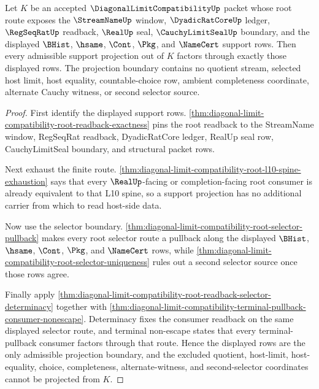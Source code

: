 \begin{theorem}
\label{thm:diagonal-limit-compatibility-root-support-projection-nonescape}
Let $K$ be an accepted $\DiagonalLimitCompatibilityUp$ packet whose root route exposes the $\StreamNameUp$ window, $\DyadicRatCoreUp$ ledger, $\RegSeqRatUp$ readback, $\RealUp$ seal, $\CauchyLimitSealUp$ boundary, and the displayed $\BHist$, $\hsame$, $\Cont$, $\Pkg$, and $\NameCert$ support rows. Then every admissible support projection out of $K$ factors through exactly those displayed rows. The projection boundary contains no quotient stream, selected host limit, host equality, countable-choice row, ambient completeness coordinate, alternate Cauchy witness, or second selector source.
\end{theorem}
\begin{proof}
First identify the displayed support rows. \autoref{thm:diagonal-limit-compatibility-root-readback-exactness} pins the root readback to the StreamName window, RegSeqRat readback, DyadicRatCore ledger, RealUp seal row, CauchyLimitSeal boundary, and structural packet rows.

Next exhaust the finite route. \autoref{thm:diagonal-limit-compatibility-root-l10-spine-exhaustion} says that every $\RealUp$-facing or completion-facing root consumer is already equivalent to that L10 spine, so a support projection has no additional carrier from which to read host-side data.

Now use the selector boundary. \autoref{thm:diagonal-limit-compatibility-root-selector-pullback} makes every root selector route a pullback along the displayed $\BHist$, $\hsame$, $\Cont$, $\Pkg$, and $\NameCert$ rows, while \autoref{thm:diagonal-limit-compatibility-root-selector-uniqueness} rules out a second selector source once those rows agree.

Finally apply \autoref{thm:diagonal-limit-compatibility-root-readback-selector-determinacy} together with \autoref{thm:diagonal-limit-compatibility-terminal-pullback-consumer-nonescape}. Determinacy fixes the consumer readback on the same displayed selector route, and terminal non-escape states that every terminal-pullback consumer factors through that route. Hence the displayed rows are the only admissible projection boundary, and the excluded quotient, host-limit, host-equality, choice, completeness, alternate-witness, and second-selector coordinates cannot be projected from $K$.
\end{proof}
